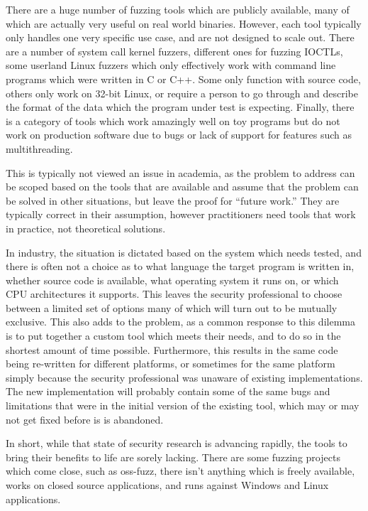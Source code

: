There are a huge number of fuzzing tools which are publicly available, many of
which are actually very useful on real world binaries.  However, each tool
typically only handles one very specific use case, and are not designed to scale
out.  There are a number of system call kernel fuzzers, different ones for
fuzzing IOCTLs, some userland Linux fuzzers which only effectively work with
command line programs which were written in C or C++.  Some only function with
source code, others only work on 32-bit Linux, or require a person to go
through and describe the format of the data which the program under test is
expecting.  Finally, there is a category of tools which work amazingly well
on toy programs but do not work on production software due to bugs or lack of
support for features such as multithreading.

This is typically not viewed an issue in academia, as the problem to address can be
scoped based on the tools that are available and assume that the problem can
be solved in other situations, but leave the proof for ``future work.''  They
are typically correct in their assumption, however practitioners need tools
that work in practice, not theoretical solutions.

In industry, the situation is dictated based on the system which needs tested,
and there is often not a choice as to what language the target program is
written in, whether source code is available, what operating system it runs
on, or which CPU architectures it supports. This leaves the security
professional to choose between a limited set of options many of which will
turn out to be mutually exclusive. This also adds to the problem, as a common
response to this dilemma is to put together a custom tool which meets their
needs, and to do so in the shortest amount of time possible.  Furthermore,
this results in the same code being re-written for different platforms, or
sometimes for the same platform simply because the security professional was
unaware of existing implementations.  The new implementation will probably
contain some of the same bugs and limitations that were in the initial
version of the existing tool, which may or may not get fixed before is is
abandoned.

In short, while that state of security research is advancing rapidly, the
tools to bring their benefits to life are sorely lacking.  There are some
fuzzing projects which come close, such as oss-fuzz,\cite{ossfuzz} there
isn't anything which is freely available, works on closed source applications,
and runs against Windows and Linux applications.
